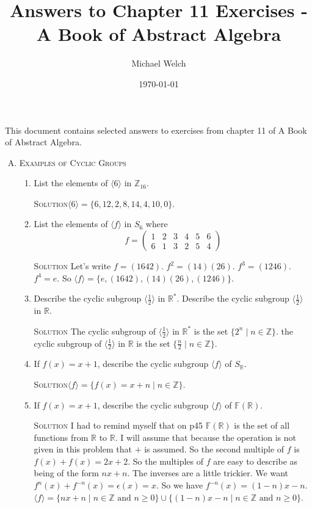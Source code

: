 \documentclass[twoside]{amsart}
\newcommand{\Reals}{\ensuremath{\mathbb{R}}\xspace}
\newcommand{\Integers}{\ensuremath{\mathbb{Z}{}}\xspace}
\newcommand{\solution}{\textsc{Solution}\xspace}
\newcommand{\blank}{\vspace{5pt}}
\newcommand{\itm}{\blank\item}
\newcommand{\sol}{\blank\noindent\solution}
\newcommand{\cgroup}[1]{\langle #1 \rangle}
\begin{document}
\title{Answers to Chapter 11 Exercises - A Book of Abstract Algebra}
\author{Michael Welch}
\date{\today}
\maketitle

This document contains selected answers to exercises from chapter 11
of A Book of Abstract Algebra.


\begin{enumerate}[A.]
   
   \item \textsc{Examples of Cyclic Groups}

   \begin{enumerate}[1)]
      \itm List the elements of $\cgroup{6}$ in $\Integers_{16}$.

      \sol $\cgroup{6} = \{ 6, 12, 2, 8, 14, 4, 10, 0 \}$.

      \itm List the elements of $\cgroup{f}$ in $S_6$ where
      \[
         f = 
            \begin{pmatrix}
               1 & 2 & 3 & 4 & 5 & 6 \\
               6 & 1 & 3 & 2 & 5 & 4
            \end{pmatrix}
      \]

      \sol Let's write $f = (1642)$. $f^2 = (14)(26)$. $f^3 = (1246)$.
      $f^4 = e$. So $\cgroup{f} = \{ e, (1642), (14)(26), (1246) \}$.

      \itm Describe the cyclic subgroup $\cgroup{\frac{1}{2}}$ in 
      $\Reals^*$. Describe the cyclic subgroup $\langle \frac{1}{2} \rangle$
      in $\Reals$.

      \sol The cyclic subgroup of $\langle \frac{1}{2} \rangle$ in 
      $\Reals^*$ is the set $\{ 2^n \mid n \in \Integers\}$.
      the cyclic subgroup of $\langle \frac{1}{2} \rangle$ in $\Reals$
      is the set $\{ \frac{n}{2} \mid n \in \Integers \}$.

      \itm If $f(x) = x + 1$, describe the cyclic subgroup $\langle f
      \rangle$ of $S_\Reals$.

      \sol $\langle f \rangle = \{ f(x) = x + n \mid n \in \Integers \}$.

      \itm If $f(x) = x + 1$, describe the cyclic subgroup $\langle f
      \rangle$ of $\mathbb{F}(\Reals)$.

      \sol I had to remind myself that on p45 $\mathbb{F}(\Reals)$ is 
      the set of all functions from $\Reals$ to $\Reals$. I will assume that
      because the operation is not given in this problem that $+$ is assumed.
      So the second multiple of $f$ is $f(x) + f(x) = 2x + 2$.  So
      the multiples of $f$ are easy to describe as being of the
      form $nx + n$. The inverses are a little trickier. We want 
      $f^n(x) + f^{-n}(x) = \epsilon(x) = x$. So we have 
      $f^{-n}(x) = (1-n)x - n $.
      $\langle f \rangle = \{ nx + n \mid n \in \Integers \text{ and } n \ge
      0\} \cup \{(1-n)x - n \mid n \in \Integers \text{ and } n \ge 0\}$.


\end{enumerate}
\end{enumerate}
\end{document}
